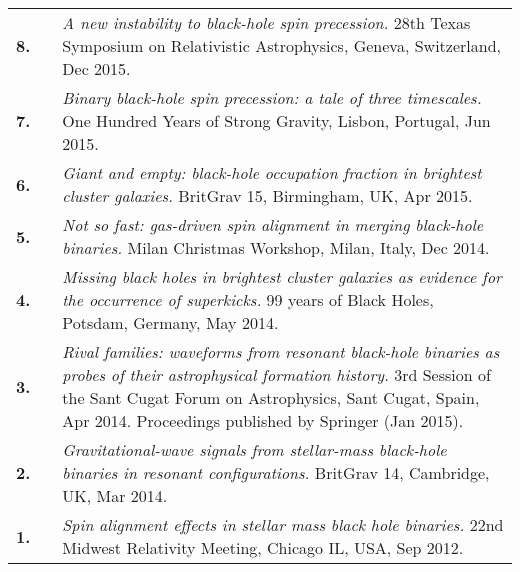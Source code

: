 \documentclass[11pt,letterpaper,sans]{moderncv}
\begin{document}
{\begin{longtable}{rp{0.3cm}p{15.8cm}}
\textbf{8.} & & \textit{A new instability to black-hole spin precession.}
\newline{}28th Texas Symposium on Relativistic Astrophysics, Geneva, Switzerland, Dec 2015.
\vspace{0.05cm}\\
\textbf{7.} & & \textit{Binary black-hole spin precession: a tale of three timescales.}
\newline{} 
One Hundred Years of Strong Gravity, Lisbon, Portugal, Jun 2015.
\vspace{0.05cm}\\
\textbf{6.} & & \textit{Giant and empty: black-hole occupation fraction in brightest cluster galaxies.}
\newline{} 
BritGrav 15, Birmingham, UK, Apr 2015.
\vspace{0.05cm}\\
\textbf{5.} & & \textit{Not so fast: gas-driven spin alignment in merging black-hole binaries.}
\newline{} 
Milan Christmas Workshop, Milan, Italy, Dec 2014.
\vspace{0.05cm}\\
\textbf{4.} & & \textit{Missing black holes in brightest cluster galaxies as evidence for the occurrence of superkicks.}
\newline{} 
99 years of Black Holes, Potsdam, Germany, May 2014.
\vspace{0.05cm}\\
\textbf{3.} & & \textit{Rival families: waveforms from resonant black-hole binaries as probes of their astrophysical formation history.}
\newline{} 
3rd Session of the Sant Cugat Forum on Astrophysics, Sant Cugat, Spain, Apr 2014.
\newline{} 
Proceedings published by Springer (Jan 2015).
\vspace{0.05cm}\\
\textbf{2.} & & \textit{Gravitational-wave signals from stellar-mass black-hole binaries in resonant configurations.}
\newline{} 
BritGrav 14, Cambridge, UK, Mar 2014.
\vspace{0.05cm}\\
\textbf{1.} & & \textit{Spin alignment effects in stellar mass black hole binaries.}
\newline{} 
22nd Midwest Relativity Meeting, Chicago IL, USA, Sep 2012.
\vspace{0.05cm}\\
\end{longtable}
}
\end{document}
